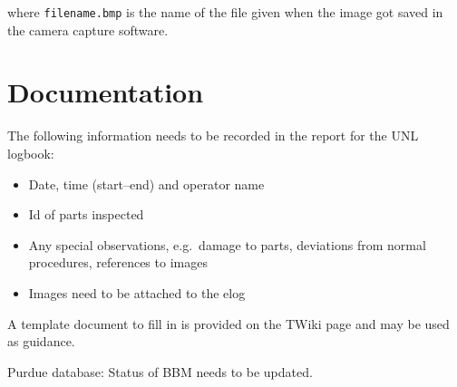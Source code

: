 \documentclass[12pt]{unlsilabsop}
\begin{document}
\medskip

where \texttt{filename.bmp} is the name of the file given when the image got saved in the camera capture software.

\section{Documentation}
The following information needs to be recorded in the report for the UNL logbook:
\begin{itemize}
    \item Date, time (start--end) and operator name
    \item Id of parts inspected
    \item Any special observations, e.g.~damage to parts, deviations from normal procedures, references to images
    \item Images need to be attached to the elog
\end{itemize}
A template document to fill in is provided on the TWiki page and may be used as guidance.

Purdue database: Status of BBM needs to be updated.
\end{document}
